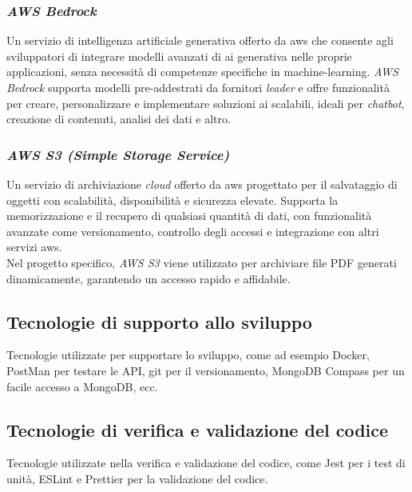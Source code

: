 \subsubsection{\textit{AWS Bedrock}}

Un servizio di intelligenza artificiale generativa offerto da \gls{aws} che consente agli sviluppatori di integrare modelli avanzati di \gls{ai} generativa nelle proprie applicazioni, senza necessità di competenze specifiche in \gls{machine-learning}. 
\textit{AWS Bedrock} supporta modelli pre-addestrati da fornitori \textit{leader} e offre funzionalità per creare, personalizzare e implementare soluzioni \gls{ai} scalabili, ideali per \textit{chatbot}, creazione di contenuti, analisi dei dati e altro.


\subsubsection{\textit{AWS S3 (Simple Storage Service)}}

Un servizio di archiviazione \textit{cloud} offerto da \gls{aws} progettato per il salvataggio di oggetti con scalabilità, disponibilità e sicurezza elevate. Supporta la memorizzazione e il recupero di qualsiasi quantità di dati, con funzionalità avanzate come versionamento, controllo degli accessi e integrazione con altri servizi \gls{aws}. \\
Nel progetto specifico, \textit{AWS S3} viene utilizzato per archiviare file PDF generati dinamicamente, garantendo un accesso rapido e affidabile.

\subsection{Tecnologie di supporto allo sviluppo}
\label{sez:tecnologie-supporto-sviluppo}

Tecnologie utilizzate per supportare lo sviluppo, come ad esempio Docker, PostMan per testare le API, git per il versionamento, MongoDB Compass per un facile accesso a MongoDB, ecc.

\subsection{Tecnologie di verifica e validazione del codice}
\label{sez:tecnologie-validazione-codice}

Tecnologie utilizzate nella verifica e validazione del codice, come Jest per i test di unità, ESLint e Prettier per la validazione del codice. 